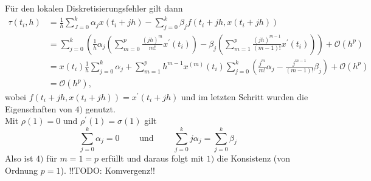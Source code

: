 Für den lokalen Diskretisierungsfehler gilt dann
\begin{align*}
    \tau(t_i,h) &= \frac{1}{h} \sum_{J=0}^{k} \alpha_j x(t_i + jh) - \sum_{j=0}^{k} \beta_j f(t_i+jh,x(t_i+jh))\\
    &= \sum_{j=0}^{k}\left( \frac{1}{h}\alpha_j \left( \sum_{m=0}^{p} \frac{(jh)^m}{m!}x^{\prime}(t_i)  \right)
    - \beta_j \left( \sum_{m=1}^{p} \frac{(jh)^{m-1}}{(m-1)!}x^{\prime}(t_i) \right) \right) + \mathcal{O}(h^p) \\
    &= x(t_i) \frac{1}{h} \sum_{j=0}^{k} \alpha_j + \sum_{m=1}^{p} h^{m-1} x^{(m
    )}(t_i)
    \sum_{j=0}^{k}\left( \frac{j^m}{m!} \alpha_j - \frac{j^{m-1}}{(m-1)!} \beta_j \right) + \mathcal{O}(h^p)\\
    &= \mathcal{O}(h^p),
\end{align*}
wobei $f(t_i+jh,x(t_i+jh)) = x^{\prime}(t_i+jh)$ und im letzten Schritt wurden die Eigenschaften von $4)$ genutzt.\\
Mit $\rho(1) = 0$ und $\rho^{\prime}(1)=\sigma(1)$ gilt
\[
    \sum_{j=0}^{k} \alpha_j = 0 \qquad \text{ und } \qquad \sum_{j=0}^{k} j \alpha_j = \sum_{j=0}^{k} \beta_j
\]
Also ist $4)$ für $m=1=p$ erfüllt und daraus folgt mit $1)$ die Konsistenz (von Ordnung $p=1$). \qedwhite
!!TODO: Komvergenz!!\\
